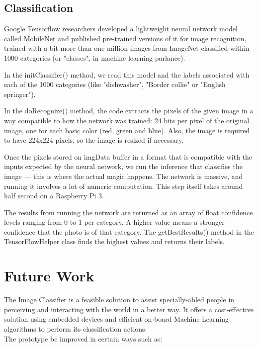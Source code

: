 \documentclass[a4paper,conference]{IEEEtran}
\begin{document}
\subsection{Classification} \label{Classification}

Google Tensorflow researchers developed a lightweight neural network model called MobileNet and published pre-trained versions of it for image recognition, trained with a bit more than one million images from ImageNet classified within 1000 categories (or "classes", in machine learning parlance).

In the initClassifier() method, we read this model and the labels associated with each of the 1000 categories (like "dishwasher", "Border collie" or "English springer").

In the doRecognize() method, the code extracts the pixels of the given image in a way compatible to how the network was trained: 24 bits per pixel of the original image, one for each basic color (red, green and blue). Also, the image is required to have 224x224 pixels, so the image is resized if necessary.

Once the pixels stored on imgData buffer in a format that is compatible with the inputs expected by the neural network, we run the inference that classifies the image — this is where the actual magic happens. The network is massive, and running it involves a lot of numeric computation. This step itself takes around half second on a Raspberry Pi 3.

The results from running the network are returned as an array of float confidence levels ranging from 0 to 1 per category. A higher value means a stronger confidence that the photo is of that category. The getBestResults() method in the TensorFlowHelper class finds the highest values and returns their labels.

	\section{Future Work} \label{section:conclusion}

		The Image Classifier is a feasible solution to assist specially-abled people in perceiving and interacting with the world in a better way. It offers a cost-effective solution using embedded devices and efficient on-board Machine Learning algorithms to perform its classification actions.\\
	  The prototype be improved in certain ways such as:
	
\end{document}
